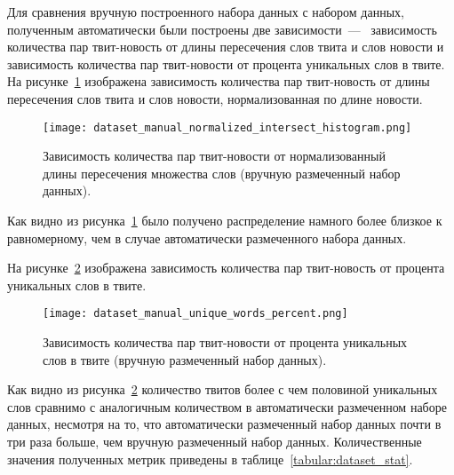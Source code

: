        Для сравнения вручную построенного набора данных с набором данных, полученным автоматически были построены две зависимости~---~
        зависимость количества пар твит-новость от длины пересечения слов твита и слов новости и зависимость количества пар твит-новости от процента уникальных слов в твите.
        На рисунке~\ref{pic:manual_histogram} изображена зависимость количества пар твит-новость от длины пересечения слов твита и слов новости, нормализованная по длине новости.
        \begin{figure}[h!]
            \center
            \texttt{[image: dataset\_manual\_normalized\_intersect\_histogram.png]}
            \caption{Зависимость количества пар твит-новости от нормализованный длины пересечения множества слов (вручную размеченный набор данных).}
            \label{pic:manual_histogram}
        \end{figure}
        Как видно из рисунка~\ref{pic:manual_histogram} было получено распределение намного более близкое к равномерному, чем в случае автоматически размеченного набора данных.

        На рисунке~\ref{pic:manual_percent} изображена зависимость количества пар твит-новость от процента уникальных слов в твите.
        \begin{figure}[h!]
            \center
            \texttt{[image: dataset\_manual\_unique\_words\_percent.png]}
            \caption{Зависимость количества пар твит-новости от процента уникальных слов в твите (вручную размеченный набор данных).}
            \label{pic:manual_percent}
        \end{figure}
        Как видно из рисунка~\ref{pic:manual_percent} количество твитов более с чем половиной уникальных слов сравнимо с аналогичным количеством в автоматически размеченном наборе данных,
        несмотря на то, что автоматически размеченный набор данных почти в три раза больше, чем вручную размеченный набор данных.
        Количественные значения полученных метрик приведены в таблице~\ref{tabular:dataset_stat}.

